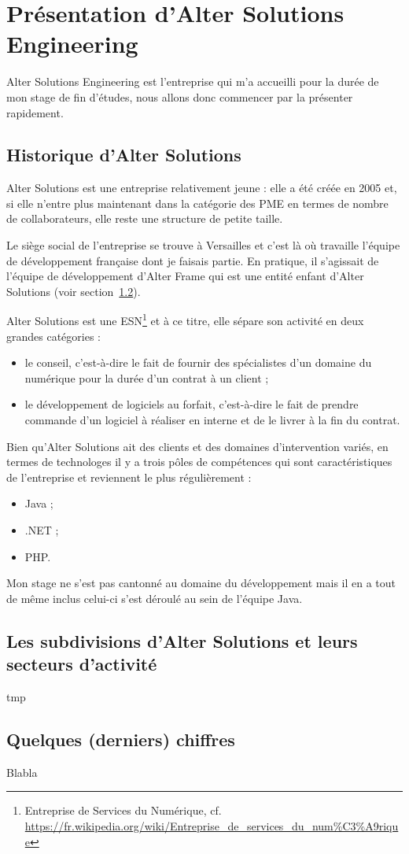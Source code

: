 \section{Présentation d'Alter Solutions Engineering}

Alter Solutions Engineering est l'entreprise qui m'a accueilli pour la durée de mon stage de fin d'études, nous allons donc commencer par la présenter rapidement.

\subsection{Historique d'Alter Solutions}
Alter Solutions est une entreprise relativement jeune : elle a été créée en 2005 et, si elle n'entre plus maintenant dans la catégorie des PME en termes de nombre de collaborateurs, elle reste une structure de petite taille.

Le siège social de l'entreprise se trouve à Versailles et c'est là où travaille l'équipe de développement française dont je faisais partie. En pratique, il s'agissait de l'équipe de développement d'Alter Frame qui est une entité enfant d'Alter Solutions (voir section~\ref{subsec:subdivisions}).

Alter Solutions est une ESN\footnote{Entreprise de Services du Numérique, cf. \url{https://fr.wikipedia.org/wiki/Entreprise_de_services_du_num\%C3\%A9rique}} et à ce titre, elle sépare son activité en deux grandes catégories :
    \begin{itemize}[label=$\bullet$]
    \item le conseil, c'est-à-dire le fait de fournir des spécialistes d'un domaine du numérique pour la durée d'un contrat à un client ;
    \item le développement de logiciels au forfait, c'est-à-dire le fait de prendre commande d'un logiciel à réaliser en interne et de le livrer à la fin du contrat.
    \end{itemize}

    Bien qu'Alter Solutions ait des clients et des domaines d'intervention variés, en termes de technologes il y a trois pôles de compétences qui sont caractéristiques de l'entreprise et reviennent le plus régulièrement :
    \begin{itemize}[label=$\bullet$]
    \item Java ;
    \item .NET ;
    \item PHP.
    \end{itemize}

Mon stage ne s'est pas cantonné au domaine du développement mais il en a tout de même inclus celui-ci s'est déroulé au sein de l'équipe Java. 

\subsection{Les subdivisions d'Alter Solutions et leurs secteurs d'activité}
\label{subsec:subdivisions}
tmp

\subsection{Quelques (derniers) chiffres}
Blabla

